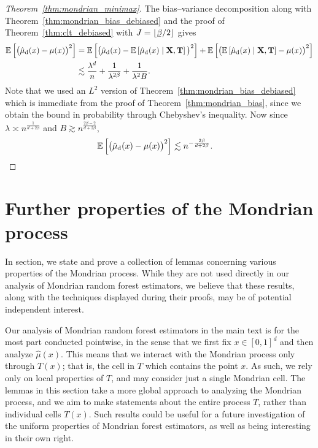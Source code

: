 \begin{proof}[Theorem~\ref{thm:mondrian_minimax}]

  The bias--variance decomposition along with
  Theorem~\ref{thm:mondrian_bias_debiased}
  and the proof of Theorem~\ref{thm:clt_debiased}
  with $J = \lfloor \flbeta / 2 \rfloor$ gives
  \begin{align*}
    \mathbb{E} \left[
      \big(
        \hat \mu_{\mathrm{d}}(x)
        - \mu(x)
      \big)^2
    \right]
    &=
    \mathbb{E} \left[
      \big(
        \hat \mu_{\mathrm{d}}(x)
        - \mathbb{E} \left[ \hat \mu_{\mathrm{d}}(x) \mid \mathbf{X}, \mathbf{T} \right]
      \big)^2
    \right]
    + \mathbb{E} \left[
      \big(
        \mathbb{E} \left[ \hat \mu_{\mathrm{d}}(x) \mid \mathbf{X}, \mathbf{T} \right]
        - \mu(x)
      \big)^2
    \right] \\
    &\lesssim
    \frac{\lambda^d}{n}
    + \frac{1}{\lambda^{2\beta}}
    + \frac{1}{\lambda^2 B}.
  \end{align*}
  Note that we used an $L^2$ version of Theorem~\ref{thm:mondrian_bias_debiased}
  which is immediate from the proof of Theorem~\ref{thm:mondrian_bias},
  since we obtain the bound in probability through
  Chebyshev's inequality.
  Now since
  $\lambda \asymp n^{\frac{1}{d + 2 \beta}}$
  and
  $B \gtrsim n^{\frac{2 \beta - 2}{d + 2 \beta}}$,
  \begin{align*}
    \mathbb{E} \left[
      \big(
        \hat \mu_{\mathrm{d}}(x)
        - \mu(x)
      \big)^2
    \right]
    &\lesssim
    n^{-\frac{2\beta}{d + 2 \beta}}.
  \end{align*}
\end{proof}

\section{Further properties of the Mondrian process}

In section, we state and prove a collection of lemmas concerning
various properties of the Mondrian process. While they are not used directly
in our analysis of Mondrian random forest estimators, we believe that
these results, along with the techniques displayed during their proofs,
may be of potential independent interest.

Our analysis of Mondrian random forest estimators in the main text
is for the most part
conducted pointwise, in the sense that we first fix $x \in [0,1]^d$
and then analyze $\hat\mu(x)$. This means that we interact with the Mondrian
process
only through $T(x)$; that is, the cell in $T$ which contains the point $x$.
As such, we rely only on local properties of $T$, and may consider just a
single Mondrian cell. The lemmas in this section take a more global approach
to analyzing the Mondrian process, and we aim to make statements about the
entire process $T$, rather than individual cells $T(x)$.
Such results could be useful for a future investigation of the uniform
properties of Mondrian forest estimators, as well as
being interesting in their own right.

